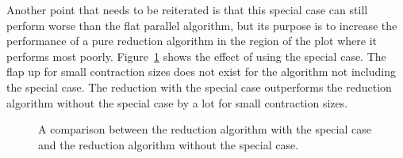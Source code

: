 Another point that needs to be reiterated is that this special case can still
perform worse than the flat parallel algorithm, but its purpose is to increase
the performance of a pure reduction algorithm in the region of the plot where it performs most poorly. Figure~\ref{CFFSTeamReduceSpecialCaseGraph} shows the effect of using the
special case. The flap up for small contraction sizes does not
exist for the algorithm not including the special case. The reduction with the special case outperforms the reduction algorithm without the special case by a lot for 
small contraction sizes.

\begin{figure}
    \centering
	\:
        \caption[Reduction special case comparison]{A comparison between the reduction algorithm with the special case
    and the reduction algorithm without the special case.}
\label{CFFSTeamReduceSpecialCaseGraph}
\end{figure}

